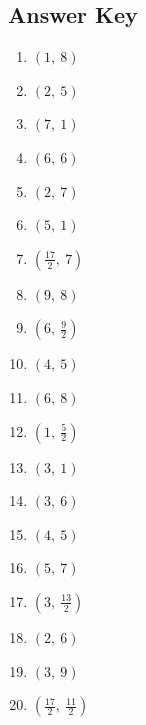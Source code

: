 \documentclass{article}
\begin{document}
\begin{enumerate}
\end{enumerate}

\newpage

\subsection*{Answer Key}

\begin{enumerate}
\item $\left( 1, \  8\right) $ 
\item $\left( 2, \  5\right) $ 
\item $\left( 7, \  1\right) $ 
\item $\left( 6, \  6\right) $ 
\item $\left( 2, \  7\right) $ 
\item $\left( 5, \  1\right) $ 
\item $\left( \frac{17}{2}, \  7\right) $ 
\item $\left( 9, \  8\right) $ 
\item $\left( 6, \  \frac{9}{2}\right) $ 
\item $\left( 4, \  5\right) $ 
\item $\left( 6, \  8\right) $ 
\item $\left( 1, \  \frac{5}{2}\right) $ 
\item $\left( 3, \  1\right) $ 
\item $\left( 3, \  6\right) $ 
\item $\left( 4, \  5\right) $ 
\item $\left( 5, \  7\right) $ 
\item $\left( 3, \  \frac{13}{2}\right) $ 
\item $\left( 2, \  6\right) $ 
\item $\left( 3, \  9\right) $ 
\item $\left( \frac{17}{2}, \  \frac{11}{2}\right) $ 

\end{enumerate}
\end{document}
